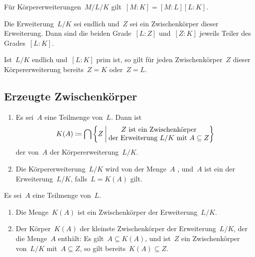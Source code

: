 \begin{theorem}[Gradformel]
  Für Körpererweiterungen~$M/L/K$ gilt~$[M : K] = [M : L] [L : K]$.
\end{theorem}

\begin{corollary}
  Die Erweiterung~$L/K$ sei endlich und~$Z$ sei ein Zwischenkörper dieser Erweiterung.
  Dann sind die beiden Grade~$[L : Z]$ und~$[Z : K]$ jeweils Teiler des Grades~$[L : K]$.
\end{corollary}

\begin{example}
  Ist~$L/K$ endlich und~$[L : K]$ prim ist, so gilt für jeden Zwischenkörper~$Z$ dieser Körpererweiterung bereits~$Z = K$ oder~$Z = L$.
\end{example}



\subsection{Erzeugte Zwischenkörper}

\begin{definition}
  \leavevmode
  \begin{enumerate}
    \item
      Es sei~$A$ eine Teilmenge von~$L$.
      Dann ist
      \[
        K(A)
        \defined
        \bigcap
        \left\{
          Z
        \suchthat*
          \begin{tabular}{@{}c@{}}
             $Z$ ist ein Zwischenkörper\\
             der Erweiterung~$L/K$ mit~$A \subseteq Z$
          \end{tabular}
        \right\}
      \]
      der von~$A$  der Körpererweiterung~$L/K$.
    \item
      Die Körpererweiterung~$L/K$ wird von der Menge~$A$ , und~$A$ ist ein  der Erweiterung~$L/K$, falls~$L = K(A)$ gilt.
  \end{enumerate}
\end{definition}

\begin{proposition}
  Es sei~$A$ eine Teilmenge von~$L$.
  \begin{enumerate}
    \item
      Die Menge~$K(A)$ ist ein Zwischenkörper der Erweiterung~$L/K$.
    \item
      Der Körper~$K(A)$ der kleinste Zwischenkörper der Erweiterung~$L/K$, der die Menge~$A$ enthält:
      Es gilt~$A \subseteq K(A)$, und ist~$Z$ ein Zwischenkörper von~$L/K$ mit~$A \subseteq Z$, so gilt bereits~$K(A) \subseteq Z$.
  \end{enumerate}
\end{proposition}


